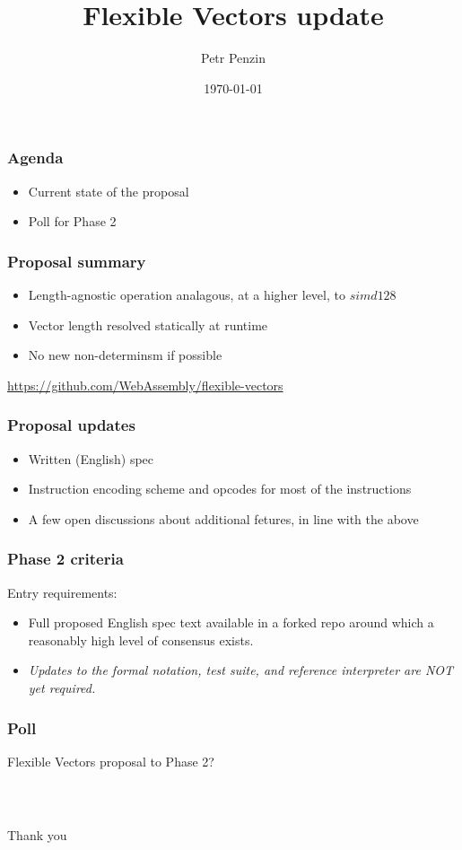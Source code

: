 \documentclass[t,aspectratio=169, xcolor={table}]{beamer}
\title{Flexible Vectors update}
\author{Petr Penzin}
\institute{Intel Corporation}
\date{\today}
\begin{document}
\begin{frame}
  \titlepage
\end{frame}
\begin{frame}
\frametitle{Agenda}
  \begin{itemize}
  \item Current state of the proposal
  \item Poll for Phase 2
  \end{itemize}
\end{frame}
\begin{frame}
\frametitle{Proposal summary}
  \begin{itemize}
  \item Length-agnostic operation analagous, at a higher level, to $simd128$
  \item Vector length resolved statically at runtime
  \item No new non-determinsm if possible %
  \end{itemize}
  \url{https://github.com/WebAssembly/flexible-vectors}
\end{frame}
\begin{frame}
\frametitle{Proposal updates}
  \begin{itemize}
  \item Written (English) spec
  \item Instruction encoding scheme and opcodes for most of the instructions
  \item A few open discussions about additional fetures, in line with the above
  \end{itemize}
\end{frame}
\begin{frame}
\frametitle{Phase 2 criteria}
  Entry requirements:
  \begin{itemize}
  \item Full proposed English spec text available in a forked repo around which a reasonably high level of consensus exists.
  \item \textit{Updates to the formal notation, test suite, and reference interpreter are NOT yet required.}
  \end{itemize}
\end{frame}
\begin{frame}
\frametitle{Poll}
  Flexible Vectors proposal to Phase 2?
\end{frame}
\begin{frame}
\frametitle{~}
\huge{Thank you}
\end{frame}
\end{document}
